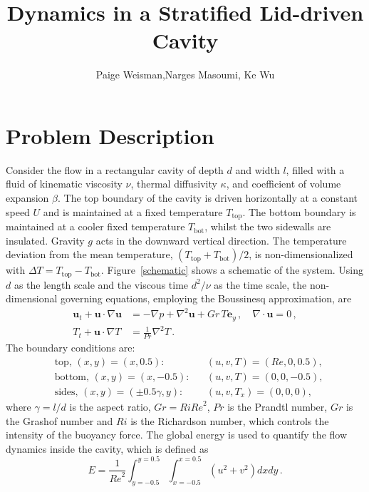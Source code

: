 \documentclass[12pt]{article}
\newcommand{\Rey}{\mathit{Re}}
\newcommand{\Ri}{\mathit{Ri}}
\newcommand{\Gr}{\mathit{Gr}}
\newcommand{\Ek}{\mathit{E}}
\renewcommand{\Pr}{\mathit{Pr}}
\begin{document}
\title{Dynamics in a Stratified Lid-driven Cavity}
\author{Paige Weisman,Narges Masoumi, Ke Wu}
\maketitle
 
\section{Problem Description}
Consider the flow in a rectangular cavity of depth $d$ and width $l$,
filled with a fluid of kinematic viscosity $\nu$, thermal diffusivity
$\kappa$, and coefficient of volume expansion $\beta$. The top
boundary of the cavity is driven horizontally at a constant speed $U$
and is maintained at a fixed temperature $T_\text{top}$. The bottom
boundary is maintained at a cooler fixed temperature $T_\text{bot}$,
whilst the two sidewalls are insulated. Gravity $g$ acts in the
downward vertical direction. The temperature deviation from the mean temperature,
$(T_\text{top}+T_\text{bot})/2$, is non-dimensionalized with $\Delta
T= T_\text{top}-T_\text{bot}$. Figure~\ref{schematic} shows a
schematic of the system. Using $d$ as the length scale and the viscous
time $d^2/\nu$ as the time scale, the non-dimensional governing
equations, employing the Boussinesq approximation, are
\begin{equation}  \label{goveq}
  \begin{aligned}
    \bm{u}_t+\bm{u}\cdot\nabla \bm{u} &= -\nabla p + \nabla^2\bm{u}
    + \Gr\,T\bm{e}_y\,, \quad   \nabla\cdot\bm{u}=0\,,\\ 
    T_t+\bm{u}\cdot\nabla T &= \frac{1}{\Pr} \nabla^2T\,.
  \end{aligned}
\end{equation}
The boundary conditions are:
\begin{equation}
\begin{aligned}
 & \text{top,    }  (x,y)=(x,0.5):       &&  (u,v,T)=(\Rey,0,0.5), \\
 & \text{bottom, }  (x,y)=(x,-0.5):      &&  (u,v,T)=(0,0,-0.5),\\
 & \text{sides,  }  (x,y)=(\pm0.5\gamma,y): &&  (u,v,T_x)=(0,0,0),
\end{aligned}
\end{equation}
where $\gamma=l/d$ is the aspect ratio, $\Gr=\Ri \Rey^{2}$, $\Pr$ is the Prandtl number,
$\Gr$ is the Grashof number and $\Ri$ is the Richardson number, which controls
the intensity of the buoyancy force. The global energy is used to
quantify the flow dynamics inside the cavity, which is defined as 
\begin{equation} \label{Ek}
\Ek = \frac{1}{\Rey^{2}}\int_{y=-0.5}^{y=0.5}\int_{x=-0.5}^{x=0.5}
(u^{2}+v^{2})dxdy\,.
\end{equation}
\end{document}
